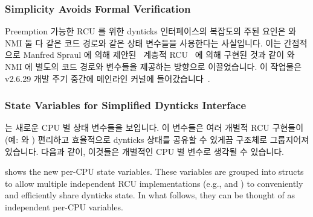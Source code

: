 \fi

\subsubsection{Simplicity Avoids Formal Verification}
\label{sec:formal:Simplicity Avoids Formal Verification}

Preemption 가능한 RCU 를 위한 dynticks 인터페이스의 복잡도의 주된 요인은 \IRQ
와 NMI 둘 다 같은 코드 경로와 같은 상태 변수들을 사용한다는 사실입니다.
이는 간접적으로 Manfred Spraul 에 의해
제안된~\cite{ManfredSpraul2008StateMachineRCU} 계층적
RCU~\cite{PaulEMcKenney2008HierarchicalRCU} 에 의해 구현된 것과 같이 \IRQ 와
NMI 에 별도의 코드 경로와 변수들을 제공하는 방향으로 이끌었습니다.
이 작업물은 v2.6.29 개발 주기 중간에 메인라인 커널에
들어갔습니다~\cite{PaulEMcKenney2008commit:64db4cfff99c}.

\iffalse

The complexity of the dynticks interface for preemptible RCU is primarily
due to the fact that both \IRQ s and NMIs use the same code path and the
same state variables.
This leads to the notion of providing separate code paths and variables
for \IRQ s and NMIs, as has been done for
hierarchical RCU~\cite{PaulEMcKenney2008HierarchicalRCU}
as indirectly suggested by
Manfred Spraul~\cite{ManfredSpraul2008StateMachineRCU}.
This work was pulled into mainline kernel during the v2.6.29
development cycle~\cite{PaulEMcKenney2008commit:64db4cfff99c}.

\fi

\subsubsection{State Variables for Simplified Dynticks Interface}
\label{sec:formal:State Variables for Simplified Dynticks Interface}

는 새로운 CPU 별 상태 변수들을 보입니다.
이 변수들은 여러 개별적 RCU 구현들이 (예:  와 ) 편리하고
효율적으로 dynticks 상태를 공유할 수 있게끔 구조체로 그룹지어져 있습니다.
다음과 같이, 이것들은 개별적인 CPU 별 변수로 생각될 수 있습니다.

\iffalse

shows the new per-CPU state variables.
These variables are grouped into structs to allow multiple independent
RCU implementations (e.g.,  and ) to conveniently
and efficiently share dynticks state.
In what follows, they can be thought of as independent per-CPU variables.

